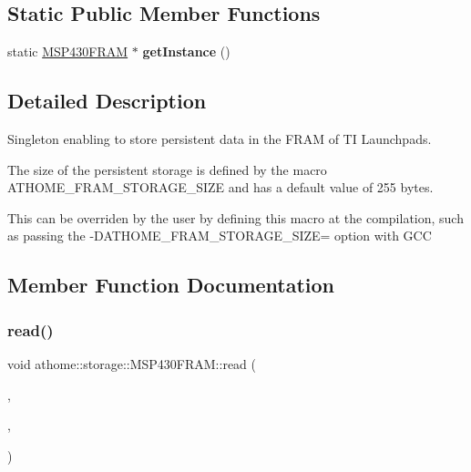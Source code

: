 \subsection*{Static Public Member Functions}
\begin{DoxyCompactItemize}
\item 
\mbox{\label{classathome_1_1storage_1_1_m_s_p430_f_r_a_m_aafeeb8882c31af72dfa4054e27263fa6}} 
static \mbox{\hyperlink{classathome_1_1storage_1_1_m_s_p430_f_r_a_m}{M\+S\+P430\+F\+R\+AM}} $\ast$ {\bfseries get\+Instance} ()
\end{DoxyCompactItemize}


\subsection{Detailed Description}
Singleton enabling to store persistent data in the F\+R\+AM of TI Launchpads.

The size of the persistent storage is defined by the macro A\+T\+H\+O\+M\+E\+\_\+\+F\+R\+A\+M\+\_\+\+S\+T\+O\+R\+A\+G\+E\+\_\+\+S\+I\+ZE and has a default value of 255 bytes.

This can be overriden by the user by defining this macro at the compilation, such as passing the {\ttfamily -\/\+D\+A\+T\+H\+O\+M\+E\+\_\+\+F\+R\+A\+M\+\_\+\+S\+T\+O\+R\+A\+G\+E\+\_\+\+S\+I\+ZE=} option with G\+CC 

\subsection{Member Function Documentation}
\mbox{\label{classathome_1_1storage_1_1_m_s_p430_f_r_a_m_a3a00a26565491d08d26f505930453fb7}} 
\subsubsection{\texorpdfstring{read()}{read()}}
{\footnotesize\ttfamily void athome\+::storage\+::\+M\+S\+P430\+F\+R\+A\+M\+::read (\begin{DoxyParamCaption}\item[{size\+\_\+t}]{,  }\item[{void $\ast$}]{,  }\item[{size\+\_\+t}]{ }\end{DoxyParamCaption})\hspace{0.3cm}{\ttfamily [virtual]}}


